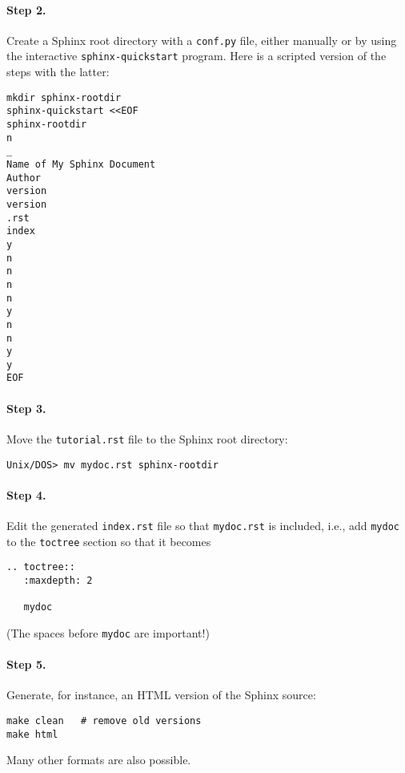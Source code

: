 \documentclass{article}
\begin{document}
\paragraph{Step 2.}
Create a Sphinx root directory with a {\fontsize{10pt}{10pt}\verb!conf.py!} file, 
either manually or by using the interactive {\fontsize{10pt}{10pt}\verb!sphinx-quickstart!}
program. Here is a scripted version of the steps with the latter:
\begin{Verbatim}[fontsize=\fontsize{9pt}{9pt},tabsize=8,baselinestretch=0.85,
fontfamily=tt,xleftmargin=7mm]
mkdir sphinx-rootdir
sphinx-quickstart <<EOF
sphinx-rootdir
n
_
Name of My Sphinx Document
Author
version
version
.rst
index
y
n
n
n
n
y
n
n
y
y
EOF
\end{Verbatim}
\noindent

\paragraph{Step 3.}
Move the {\fontsize{10pt}{10pt}\verb!tutorial.rst!} file to the Sphinx root directory:
\begin{Verbatim}[fontsize=\fontsize{9pt}{9pt},tabsize=8,baselinestretch=0.85,
fontfamily=tt,xleftmargin=7mm]
Unix/DOS> mv mydoc.rst sphinx-rootdir
\end{Verbatim}
\noindent

\paragraph{Step 4.}
Edit the generated {\fontsize{10pt}{10pt}\verb!index.rst!} file so that {\fontsize{10pt}{10pt}\verb!mydoc.rst!}
is included, i.e., add {\fontsize{10pt}{10pt}\verb!mydoc!} to the {\fontsize{10pt}{10pt}\verb!toctree!} section so that it becomes
\begin{Verbatim}[fontsize=\fontsize{9pt}{9pt},tabsize=8,baselinestretch=0.85,
fontfamily=tt,xleftmargin=7mm]
.. toctree::
   :maxdepth: 2

   mydoc
\end{Verbatim}
\noindent
(The spaces before {\fontsize{10pt}{10pt}\verb!mydoc!} are important!)

\paragraph{Step 5.}
Generate, for instance, an HTML version of the Sphinx source:
\begin{Verbatim}[fontsize=\fontsize{9pt}{9pt},tabsize=8,baselinestretch=0.85,
fontfamily=tt,xleftmargin=7mm]
make clean   # remove old versions
make html
\end{Verbatim}
\noindent
Many other formats are also possible.
\end{document}
